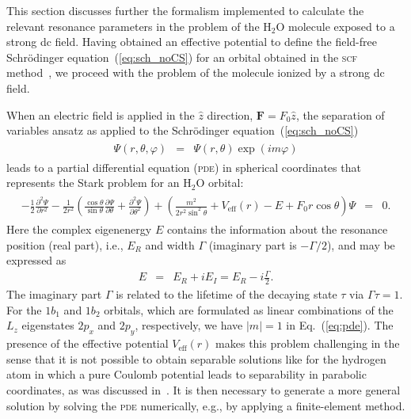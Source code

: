 This section discusses further the formalism implemented to calculate
the relevant resonance parameters in the problem of the H$_{2}$O
molecule exposed to a strong dc field. Having obtained an effective
potential to define the field-free Schr\"{o}dinger
equation~(\ref{eq:sch_noCS}) for an orbital obtained in the
\textsc{scf} method~\cite{Moccia_1964}, we proceed with the problem of
the molecule ionized by a strong dc field.

When an electric field is applied in the $\hat{z}$ direction,
$\mathbf{F} = F_{0}\hat{z}$, the separation of variables ansatz as
applied to the Schr\"{o}dinger equation~(\ref{eq:sch_noCS})
%
\begin{eqnarray}
  \begin{split}
    \Psi(r,\theta,\varphi) & = & \Psi(r,\theta)\exp(im\varphi)
  \end{split}
\label{eq:sov}
\end{eqnarray}
%
leads to a partial differential equation (\textsc{pde}) in spherical
coordinates that represents the Stark problem for an H$_{2}$O orbital:
%
\begin{eqnarray}
 \begin{split}
  -\frac{1}{2} \frac{\partial^{2}\Psi}{\partial r^2} - \frac{1}{2r^2}
  (\frac{\cos\theta}{\sin\theta} \frac{\partial\Psi}{\partial\theta} + 
  \frac{\partial^2 \Psi}{\partial\theta^2})
  + (\frac{m^2}{2r^2 \sin^2\theta} + V_{\mathrm{eff}}(r) - E +
  F_{0}r\cos\theta)\Psi & = & 0.
  \end{split}
\label{eq:pde}
\end{eqnarray}
%
Here the complex eigenenergy $E$ contains the information about the
resonance position (real part), i.e., $E_{R}$ and width $\Gamma$
(imaginary part is $-\Gamma/2$), and may be expressed as
%
\begin{eqnarray}
E & = & E_{R} + iE_{I} = E_{R} - i\frac{\Gamma}{2}.
\label{eq:complex_E}
\end{eqnarray}
%
The imaginary part $\Gamma$ is related to the lifetime of the decaying
state $\tau$ via $\Gamma\tau = 1$. For the $1b_{1}$ and $1b_{2}$
orbitals, which are formulated as linear combinations of the $L_{z}$
eigenstates $2p_{x}$ and $2p_{y}$, respectively, we have $|m| = 1$ in
Eq.~(\ref{eq:pde}). The presence of the effective potential
$V_{\mathrm{eff}}(r)$ makes this problem challenging in the sense that
it is not possible to obtain separable solutions like for the hydrogen
atom in which a pure Coulomb potential leads to separability in
parabolic coordinates, as was discussed in~\cite{Telnov_1989}. It is
then necessary to generate a more general solution by solving the
\textsc{pde} numerically, e.g., by applying a finite-element method.


